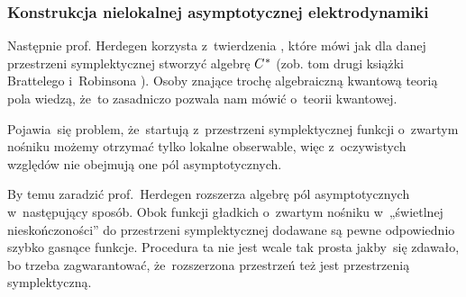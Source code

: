 \documentclass[10pt,t]{beamer}
\begin{document}










\begin{frame}
  \frametitle{Konstrukcja nielokalnej asymptotycznej
    elektrodynamiki}


  Następnie prof. Herdegen korzysta z~twierdzenia
  ,
  które mówi jak dla danej przestrzeni symplektycznej stworzyć algebrę
  $C^{ \hspace{0.05em} * }$ (zob. tom drugi książki Brattelego i~Robinsona
  \parencite{Bratteli-Robinson-Operator-algebras-ETC-Vol-I-Pub-2002}).
  Osoby znające trochę algebraiczną kwantową teorią pola wiedzą, że~to
  zasadniczo pozwala nam mówić o~teorii kwantowej.

  Pojawia~się problem, że~startują z~przestrzeni symplektycznej funkcji
  o~zwartym nośniku możemy otrzymać tylko \alert{lokalne} obserwable,
  więc z~oczywistych względów nie obejmują one pól asymptotycznych.

  By temu zaradzić prof.~Herdegen rozszerza algebrę pól asymptotycznych
  w~następujący sposób. Obok funkcji gładkich o~zwartym nośniku
  w~„świetlnej nieskończoności” do przestrzeni symplektycznej dodawane
  są pewne odpowiednio szybko gasnące funkcje. Procedura ta nie jest wcale
  tak prosta jakby~się zdawało, bo trzeba zagwarantować, że~rozszerzona
  przestrzeń też jest przestrzenią symplektyczną.

\end{frame}
\end{document}
